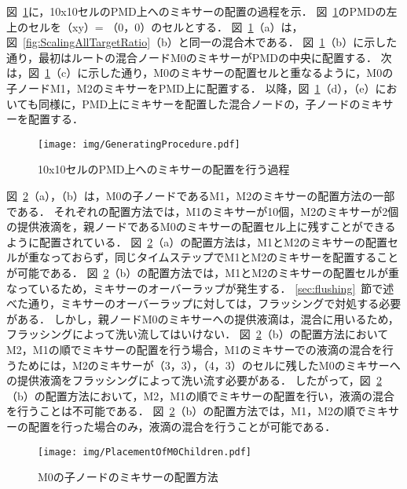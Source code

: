 図~\ref{fig:GeneratingProcedure}に，10x10セルのPMD上へのミキサーの配置の過程を示．
図~\ref{fig:GeneratingProcedure}のPMDの左上のセルを（xy）= （0，0）のセルとする．
図~\ref{fig:GeneratingProcedure}（a）は，図~\ref{fig:ScalingAllTargetRatio}（b）と同一の混合木である．
図~\ref{fig:GeneratingProcedure}（b）に示した通り，最初はルートの混合ノードM0のミキサーがPMDの中央に配置する．
次は，図~\ref{fig:GeneratingProcedure}（c）に示した通り，M0のミキサーの配置セルと重なるように，M0の子ノードM1，M2のミキサーをPMD上に配置する．
以降，図~\ref{fig:GeneratingProcedure}（d），（e）においても同様に，PMD上にミキサーを配置した混合ノードの，子ノードのミキサーを配置する．

\begin{figure}[tbp]
    \centering\texttt{[image: img/GeneratingProcedure.pdf]}
 \caption{10x10セルのPMD上へのミキサーの配置を行う過程}\label{fig:GeneratingProcedure}
\end{figure}

図~\ref{fig:PlacementOfM0Children}（a），（b）は，M0の子ノードであるM1，M2のミキサーの配置方法の一部である．
それぞれの配置方法では，M1のミキサーが10個，M2のミキサーが2個の提供液滴を，親ノードであるM0のミキサーの配置セル上に残すことができるように配置されている．
図~\ref{fig:PlacementOfM0Children}（a）の配置方法は，M1とM2のミキサーの配置セルが重なっておらず，同じタイムステップでM1とM2のミキサーを配置することが可能である．
図~\ref{fig:PlacementOfM0Children}（b）の配置方法では，M1とM2のミキサーの配置セルが重なっているため，ミキサーのオーバーラップが発生する．
\ref{sec:flushing}~節で述べた通り，ミキサーのオーバーラップに対しては，フラッシングで対処する必要がある．
しかし，親ノードM0のミキサーへの提供液滴は，混合に用いるため，フラッシングによって洗い流してはいけない．
図~\ref{fig:PlacementOfM0Children}（b）の配置方法においてM2，M1の順でミキサーの配置を行う場合，M1のミキサーでの液滴の混合を行うためには，M2のミキサーが（3，3），（4，3）のセルに残したM0のミキサーへの提供液滴をフラッシングによって洗い流す必要がある．
したがって，図~\ref{fig:PlacementOfM0Children}（b）の配置方法において，M2，M1の順でミキサーの配置を行い，液滴の混合を行うことは不可能である．
図~\ref{fig:PlacementOfM0Children}（b）の配置方法では，M1，M2の順でミキサーの配置を行った場合のみ，液滴の混合を行うことが可能である．

\begin{figure}[tbp]
    \centering\texttt{[image: img/PlacementOfM0Children.pdf]}
 \caption{M0の子ノードのミキサーの配置方法}\label{fig:PlacementOfM0Children}
\end{figure}


